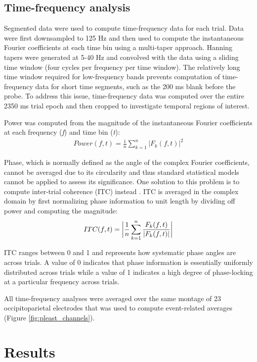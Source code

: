 \documentclass[dwyatte_dissertation.tex]{subfiles}
\begin{document}
\subsection{Time-frequency analysis}
Segmented data were used to compute time-frequency data for each trial. Data were first downsampled to 125 Hz and then used to compute the instantaneous Fourier coefficients at each time bin using a multi-taper approach. Hanning tapers were generated at 5-40 Hz and convolved with the data using a sliding time window (four cycles per frequency per time window). The relatively long time window required for low-frequency bands prevents computation of time-frequency data for short time segments, such as the 200 ms blank before the probe. To address this issue, time-frequency data was computed over the entire 2350 ms trial epoch and then cropped to investigate temporal regions of interest.

Power was computed from the magnitude of the instantaneous Fourier coefficients at each frequency (\textit{f}) and time bin (\textit{t}):
\begin{align*}
Power(f,t) = \frac{1}{n} \sum_{k=1}^{n}{|F_k(f,t)|}^2
\end{align*}

Phase, which is normally defined as the angle of the complex Fourier coefficients, cannot be averaged due to its circularity and thus standard statistical models cannot be applied to assess its significance. One solution to this problem is to compute inter-trial coherence (ITC) instead \cite{LachauxRodriguezMartinerieEtAl99}. ITC is averaged in the complex domain by first normalizing phase information to unit length by dividing off power and computing the magnitude:
\begin{align*}
ITC(f,t) = \bigg{|}\frac{1}{n} \sum_{k=1}^{n}{\frac{F_k(f,t)}{|F_k(f,t)|}}\bigg{|}
\end{align*}

ITC ranges between 0 and 1 and represents how systematic phase angles are across trials. A value of 0 indicates that phase information is essentially uniformly distributed across trials while a value of 1 indicates a high degree of phase-locking at a particular frequency across trials.

All time-frequency analyses were averaged over the same montage of 23 occipitoparietal electrodes that was used to compute event-related averages (Figure \ref{fig:pleast_channels}). 

\section{Results}
\end{document}
